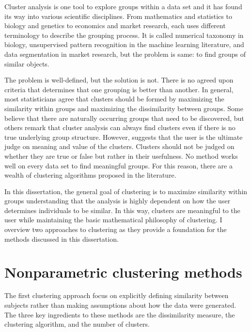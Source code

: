 Cluster analysis is one tool to explore groups within a data set and it has found its way into various scientific disciplines. From mathematics and statistics to biology and genetics to economics and market research, each uses different terminology to describe the grouping process. It is called numerical taxonomy in biology, unsupervised pattern recognition in the machine learning literature, and data segmentation in market research, but the problem is same: to find groups of similar objects.
 
The problem is well-defined, but the solution is not. There is no agreed upon criteria that determines that one grouping is better than another. In general, most statisticians agree that clusters should be formed by maximizing the similarity within groups and maximizing the dissimilarity between groups. Some believe that there are naturally occurring groups that need to be discovered, but others remark that cluster analysis can always find clusters even if there is no true underlying group structure. However, \textcite{bonner1964} suggests that the user is the ultimate judge on meaning and value of the clusters. Clusters should not be judged on whether they are true or false but rather in their usefulness. No method works well on every data set to find meaningful groups. For this reason, there are a wealth of clustering algorithms proposed in the literature. 

In this dissertation, the general goal of clustering is to maximize similarity within groups understanding that the analysis is highly dependent on how the user determines individuals to be similar. In this way, clusters are meaningful to the user while maintaining the basic mathematical philosophy of clustering.  I overview two approaches to clustering as they provide a foundation for the methods discussed in this dissertation. 

\section{Nonparametric clustering methods}\label{sec:nonpar}
The first clustering approach focus on explicitly defining similarity between subjects rather than making assumptions about how the data were generated. The three key ingredients to these methods are the dissimilarity measure, the clustering algorithm, and the number of clusters.

